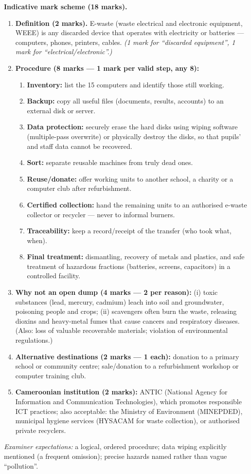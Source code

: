\documentclass[11pt]{article}
\begin{document}
\begin{corrige}
\textbf{Indicative mark scheme (18 marks).}
\begin{enumerate}
\item \textbf{Definition (2 marks).} E-waste (waste electrical and electronic equipment, WEEE) is any discarded device that operates with electricity or batteries --- computers, phones, printers, cables. \emph{(1 mark for ``discarded equipment'', 1 mark for ``electrical/electronic''.)}
\item \textbf{Procedure (8 marks --- 1 mark per valid step, any 8):}
\begin{enumerate}
\item \textbf{Inventory:} list the 15 computers and identify those still working.
\item \textbf{Backup:} copy all useful files (documents, results, accounts) to an external disk or server.
\item \textbf{Data protection:} securely erase the hard disks using wiping software (multiple-pass overwrite) or physically destroy the disks, so that pupils' and staff data cannot be recovered.
\item \textbf{Sort:} separate reusable machines from truly dead ones.
\item \textbf{Reuse/donate:} offer working units to another school, a charity or a computer club after refurbishment.
\item \textbf{Certified collection:} hand the remaining units to an authorised e-waste collector or recycler --- never to informal burners.
\item \textbf{Traceability:} keep a record/receipt of the transfer (who took what, when).
\item \textbf{Final treatment:} dismantling, recovery of metals and plastics, and safe treatment of hazardous fractions (batteries, screens, capacitors) in a controlled facility.
\end{enumerate}
\item \textbf{Why not an open dump (4 marks --- 2 per reason):} (i) toxic substances (lead, mercury, cadmium) leach into soil and groundwater, poisoning people and crops; (ii) scavengers often burn the waste, releasing dioxins and heavy-metal fumes that cause cancers and respiratory diseases. (Also: loss of valuable recoverable materials; violation of environmental regulations.)
\item \textbf{Alternative destinations (2 marks --- 1 each):} donation to a primary school or community centre; sale/donation to a refurbishment workshop or computer training club.
\item \textbf{Cameroonian institution (2 marks):} ANTIC (National Agency for Information and Communication Technologies), which promotes responsible ICT practices; also acceptable: the Ministry of Environment (MINEPDED), municipal hygiene services (HYSACAM for waste collection), or authorised private recyclers.
\end{enumerate}
\emph{Examiner expectations:} a logical, ordered procedure; data wiping explicitly mentioned (a frequent omission); precise hazards named rather than vague ``pollution''.
\end{corrige}
\end{document}
